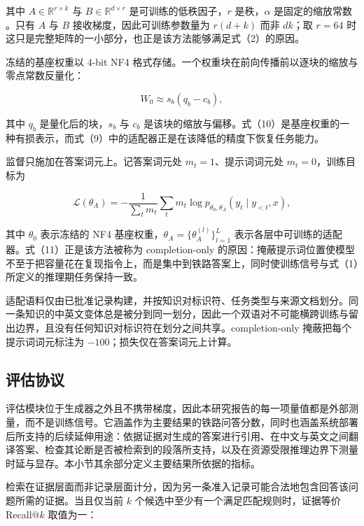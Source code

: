 \documentclass{article}
\begin{document}
其中 $A\in\mathbb{R}^{r\times k}$ 与 $B\in\mathbb{R}^{d\times r}$ 是可训练的低秩因子，$r$ 是秩，$\alpha$ 是固定的缩放常数 \citep{dettmers2023qlora}。只有 $A$ 与 $B$ 接收梯度，因此可训练参数量为 $r(d+k)$ 而非 $dk$；取 $r=64$ 时这只是完整矩阵的一小部分，也正是该方法能够满足式（2）的原因。

冻结的基座权重以 4-bit NF4 格式存储。一个权重块在前向传播前以逐块的缩放与零点常数反量化：

\begin{equation}
W_0 \approx s_b\left(q_b-c_b\right),
\end{equation}

其中 $q_b$ 是量化后的块，$s_b$ 与 $c_b$ 是该块的缩放与偏移。式（10）是基座权重的一种有损表示，而式（9）中的适配器正是在该降低的精度下恢复任务能力。

监督只施加在答案词元上。记答案词元处 $m_t=1$、提示词词元处 $m_t=0$，训练目标为

\begin{equation}
\mathcal{L}(\theta_A)=-\frac{1}{\sum_t m_t}\sum_t m_t\log p_{\theta_0,\theta_A}\!\left(y_t\mid y_{<t},x\right),
\end{equation}

其中 $\theta_0$ 表示冻结的 NF4 基座权重，$\theta_A=\{\theta_A^{(l)}\}_{l=1}^{L}$ 表示各层中可训练的适配器。式（11）正是该方法被称为 completion-only 的原因：掩蔽提示词位置使模型不至于把容量花在复现指令上，而是集中到铁路答案上，同时使训练信号与式（1）所定义的推理期任务保持一致。

适配语料仅由已批准记录构建，并按知识对标识符、任务类型与来源文档划分。同一条知识的中英文变体总是被分到同一划分，因此一个双语对不可能横跨训练与留出边界，且没有任何知识对标识符在划分之间共享。completion-only 掩蔽把每个提示词词元标注为 $-100$；损失仅在答案词元上计算。

\subsection{评估协议}

评估模块位于生成器之外且不携带梯度，因此本研究报告的每一项量值都是外部测量，而不是训练信号。它涵盖作为主要结果的铁路问答分数，同时也涵盖系统部署后所支持的后续延伸用途：依据证据对生成的答案进行引用、在中文与英文之间翻译答案、检查其论断是否被检索到的段落所支持，以及在资源受限推理边界下测量时延与显存。本小节其余部分定义主要结果所依据的指标。

检索在证据层面而非记录层面计分，因为另一条准入记录可能合法地包含回答该问题所需的证据。当且仅当前 $k$ 个候选中至少有一个满足匹配规则时，证据等价 Recall@$k$ 取值为一：
\end{document}
